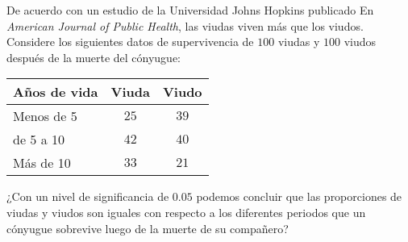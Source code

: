 \begin{enunciado}
 De acuerdo con un estudio de la Universidad Johns Hopkins publicado
 En \textit{American Journal of Public Health}, las viudas viven m\'as
 que los viudos.
 Considere los siguientes datos de supervivencia de $100$ viudas
 y $100$ viudos despu\'es de la muerte del c\'onyugue:
 \begin{center}
  \begin{tabular}{lcc}
   \textbf{A\~nos de vida} & \textbf{Viuda} & \textbf{Viudo} \\
   \hline
   Menos de 5 & $25$ & $39$ \\
   de 5 a 10 & $42$ & $40$ \\
   M\'as de 10 & $33$ & $21$
  \end{tabular}
 \end{center}
 ¿Con un nivel de significancia de $0.05$ podemos concluir
 que las proporciones de viudas y viudos son iguales
 con respecto a los diferentes periodos que un c\'onyugue sobrevive
 luego de la muerte de su compa\~nero?
\end{enunciado}

